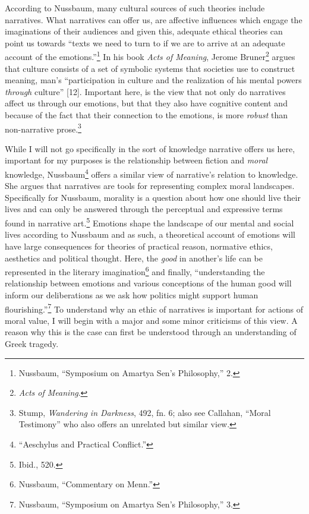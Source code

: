\documentclass[phdthesis,12pt,final]{wuthesis}
\theoremstyle{definition}
\theoremstyle{definition}
\theoremstyle{definition}
\theoremstyle{definition}
\theoremstyle{remark}
\begin{document}
According to Nussbaum, many cultural sources of such theories include narratives. What narratives can offer us, are affective influences which engage the imaginations of their audiences and given this, adequate ethical theories can point us towards ``texts we need to turn to if we are to arrive at an adequate account of the emotions.''\footnote{Nussbaum, {``Symposium on {Amartya Sen}'s Philosophy,''} 2.} In his book \emph{Acts of Meaning}, Jerome Bruner\footnote{\emph{Acts of Meaning}.} argues that culture consists of a set of symbolic systems that societies use to construct meaning, man's ``participation in culture and the realization of his mental powers \emph{through} culture'' {[}12{]}. Important here, is the view that not only do narratives affect us through our emotions, but that they also have cognitive content and because of the fact that their connection to the emotions, is more \emph{robust} than non-narrative prose.\footnote{Stump, \emph{Wandering in {Darkness}}, 492, fn. 6; also see Callahan, {``Moral {Testimony}''} who also offers an unrelated but similar view.}

While I will not go specifically in the sort of knowledge narrative offers us here, important for my purposes is the relationship between fiction and \emph{moral} knowledge, Nussbaum\footnote{{``Aeschylus and Practical Conflict.''}} offers a similar view of narrative's relation to knowledge. She argues that narratives are tools for representing complex moral landscapes. Specifically for Nussbaum, morality is a question about how one should live their lives and can only be answered through the perceptual and expressive terms found in narrative art.\footnote{Ibid., 520.} Emotions shape the landscape of our mental and social lives according to Nussbaum and as such, a theoretical account of emotions will have large consequences for theories of practical reason, normative ethics, aesthetics and political thought. Here, the \emph{good} in another's life can be represented in the literary imagination\footnote{Nussbaum, {``Commentary on {Menn}.''}} and finally, ``understanding the relationship between emotions and various conceptions of the human good will inform our deliberations as we ask how politics might support human flourishing.''\footnote{Nussbaum, {``Symposium on {Amartya Sen}'s Philosophy,''} 3.} To understand why an ethic of narratives is important for actions of moral value, I will begin with a major and some minor criticisms of this view. A reason why this is the case can first be understood through an understanding of Greek tragedy.
\end{document}
